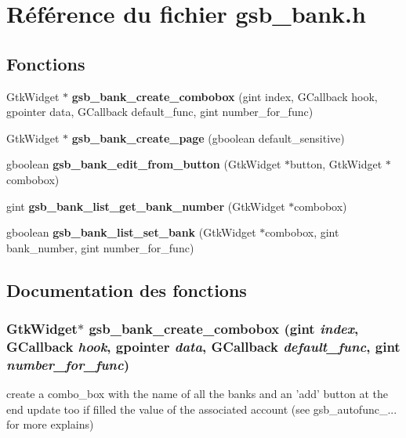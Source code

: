 \section{Référence du fichier gsb\_\-bank.h}
\label{gsb__bank_8h}
\subsection*{Fonctions}
\begin{DoxyCompactItemize}
\item 
GtkWidget $\ast$ {\bf gsb\_\-bank\_\-create\_\-combobox} (gint index, GCallback hook, gpointer data, GCallback default\_\-func, gint number\_\-for\_\-func)
\item 
GtkWidget $\ast$ {\bf gsb\_\-bank\_\-create\_\-page} (gboolean default\_\-sensitive)
\item 
gboolean {\bf gsb\_\-bank\_\-edit\_\-from\_\-button} (GtkWidget $\ast$button, GtkWidget $\ast$combobox)
\item 
gint {\bf gsb\_\-bank\_\-list\_\-get\_\-bank\_\-number} (GtkWidget $\ast$combobox)
\item 
gboolean {\bf gsb\_\-bank\_\-list\_\-set\_\-bank} (GtkWidget $\ast$combobox, gint bank\_\-number, gint number\_\-for\_\-func)
\end{DoxyCompactItemize}


\subsection{Documentation des fonctions}
\subsubsection[{gsb\_\-bank\_\-create\_\-combobox}]{\setlength{\rightskip}{0pt plus 5cm}GtkWidget$\ast$ gsb\_\-bank\_\-create\_\-combobox (gint {\em index}, \/  GCallback {\em hook}, \/  gpointer {\em data}, \/  GCallback {\em default\_\-func}, \/  gint {\em number\_\-for\_\-func})}\label{gsb__bank_8h_abb748391feb66dfd26c0e0aaffa766bb}
create a combo\_\-box with the name of all the banks and an 'add' button at the end update too if filled the value of the associated account (see gsb\_\-autofunc\_\-... for more explains)


